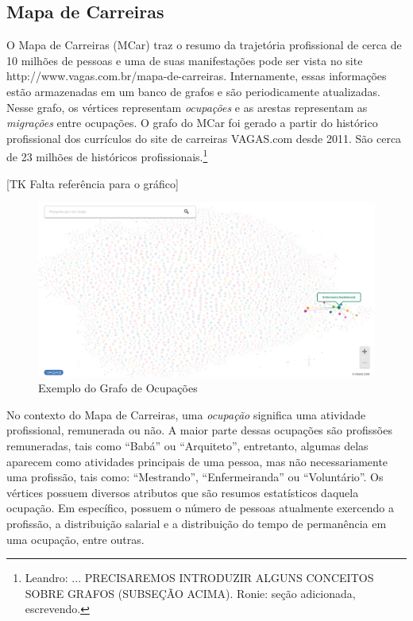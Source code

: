 \documentclass[12pt,a4paper]{article}
\begin{document}
\subsection{Mapa de Carreiras}

O Mapa de Carreiras (MCar) traz o resumo da trajetória profissional de cerca de 10 milhões de pessoas e uma de suas manifestações pode ser vista no site http://www.vagas.com.br/mapa-de-carreiras. Internamente, essas informações estão armazenadas em um banco de grafos e são periodicamente atualizadas. Nesse grafo, os vértices representam \textit{ocupações} e as arestas representam as \textit{migrações} entre ocupações. O grafo do MCar foi gerado a partir do histórico profissional dos currículos do site de carreiras VAGAS.com desde 2011. São cerca de 23 milhões de históricos profissionais.\footnote{Leandro: ... PRECISAREMOS INTRODUZIR ALGUNS CONCEITOS SOBRE GRAFOS (SUBSEÇÃO ACIMA). Ronie: seção adicionada, escrevendo.}

[TK Falta referência para o gráfico]

\begin{figure}[ht]
  \centering
  \includegraphics[scale=0.3]{Grafo_Enfermeira_Assistencial.png}
  \caption{Exemplo do Grafo de Ocupações}
  \label{fig:exemplo-grafo}
\end{figure}

No contexto do Mapa de Carreiras, uma \textit{ocupação} significa uma atividade profissional, remunerada ou não. A maior parte dessas ocupações são profissões remuneradas, tais como \enquote{Babá} ou \enquote{Arquiteto}, entretanto, algumas delas aparecem como atividades principais de uma pessoa, mas não necessariamente uma profissão, tais como: \enquote{Mestrando}, \enquote{Enfermeiranda} ou \enquote{Voluntário}. Os vértices possuem diversos atributos que são resumos estatísticos daquela ocupação. Em específico, possuem o número de pessoas atualmente exercendo a profissão, a distribuição salarial e a distribuição do tempo de permanência em uma ocupação, entre outras.
\end{document}
